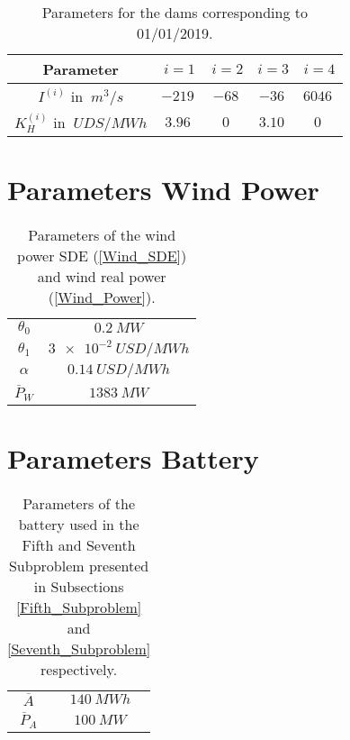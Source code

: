 \begin{table}[H]
\centering
\begin{tabular}{ccccc}
\toprule
Parameter & $i=1$ & $i=2$ & $i=3$ & $i=4$ \\
\midrule
$I^{(i)}$ in $\SI{}{m^3/s}$ & $\SI{-219}{}$ & $\SI{-68}{}$ & $\SI{-36}{}$ & $\SI{6046}{}$ \\
$K_H^{(i)}$ in $\SI{}{UDS/MWh}$ & $\SI{3.96}{}$ & $\SI{0}{}$ & $\SI{3.10}{}$ & $\SI{0}{}$ \\
\bottomrule
\end{tabular}
\caption{Parameters for the dams corresponding to 01/01/2019.}
\label{Table_Dams_2}
\end{table}

\section{Parameters Wind Power}

\begin{table}[H]
\centering
\begin{tabular}{cc}
\toprule
$\theta_0$ & $\SI{0.2}{MW}$ \\
$\theta_1$ & $\SI{3e-2}{USD/MWh}$ \\
$\alpha$ & $\SI{0.14}{USD/MWh}$ \\
$\overline{P}_W$ & $\SI{1383}{MW}$ \\
\bottomrule
\end{tabular}
\caption{Parameters of the wind power SDE (\ref{Wind_SDE}) and wind real power (\ref{Wind_Power}).}
\label{Table_Wind_Power}
\end{table}

\section{Parameters Battery}

\begin{table}[ht!]
\centering
\begin{tabular}{cc}
\toprule
$\overline{A}$ & $\SI{140}{MWh}$ \\
$\overline{P}_A$ & $\SI{100}{MW}$ \\
\bottomrule
\end{tabular}
\caption{Parameters of the battery used in the Fifth and Seventh Subproblem presented in Subsections \ref{Fifth_Subproblem} and \ref{Seventh_Subproblem} respectively.}
\label{Table_Battery}
\end{table}

